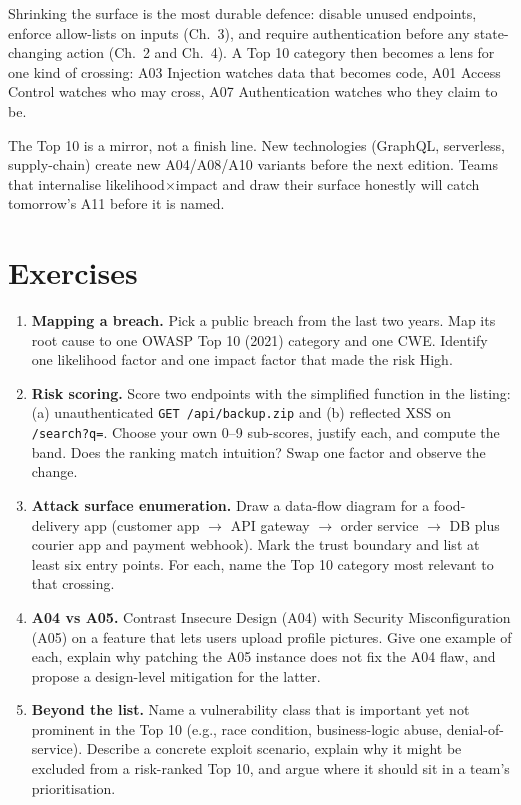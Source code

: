 Shrinking the surface is the most durable defence: disable unused endpoints, enforce allow-lists on inputs (Ch.~3), and require authentication before any state-changing action (Ch.~2 and Ch.~4). A Top 10 category then becomes a lens for one kind of crossing: A03 Injection watches data that becomes code, A01 Access Control watches who may cross, A07 Authentication watches who they claim to be.

\begin{remark}
The Top 10 is a mirror, not a finish line. New technologies (GraphQL, serverless, supply-chain) create new A04/A08/A10 variants before the next edition. Teams that internalise likelihood$\times$impact and draw their surface honestly will catch tomorrow's A11 before it is named.
\end{remark}

\section{Exercises}\label{sec:ch01-exercises}
\begin{enumerate}[label=E1.\arabic*, leftmargin=*, itemsep=0.6em]
    \item \textbf{Mapping a breach.} Pick a public breach from the last two years. Map its root cause to one OWASP Top 10 (2021) category and one CWE. Identify one likelihood factor and one impact factor that made the risk High.
    \item \textbf{Risk scoring.} Score two endpoints with the simplified function in the listing: (a) unauthenticated \texttt{GET /api/backup.zip} and (b) reflected XSS on \texttt{/search?q=}. Choose your own 0--9 sub-scores, justify each, and compute the band. Does the ranking match intuition? Swap one factor and observe the change.
    \item \textbf{Attack surface enumeration.} Draw a data-flow diagram for a food-delivery app (customer app $\to$ API gateway $\to$ order service $\to$ DB plus courier app and payment webhook). Mark the trust boundary and list at least six entry points. For each, name the Top 10 category most relevant to that crossing.
    \item \textbf{A04 vs A05.} Contrast Insecure Design (A04) with Security Misconfiguration (A05) on a feature that lets users upload profile pictures. Give one example of each, explain why patching the A05 instance does not fix the A04 flaw, and propose a design-level mitigation for the latter.
    \item \textbf{Beyond the list.} Name a vulnerability class that is important yet not prominent in the Top 10 (e.g., race condition, business-logic abuse, denial-of-service). Describe a concrete exploit scenario, explain why it might be excluded from a risk-ranked Top 10, and argue where it should sit in a team's prioritisation.
\end{enumerate}

